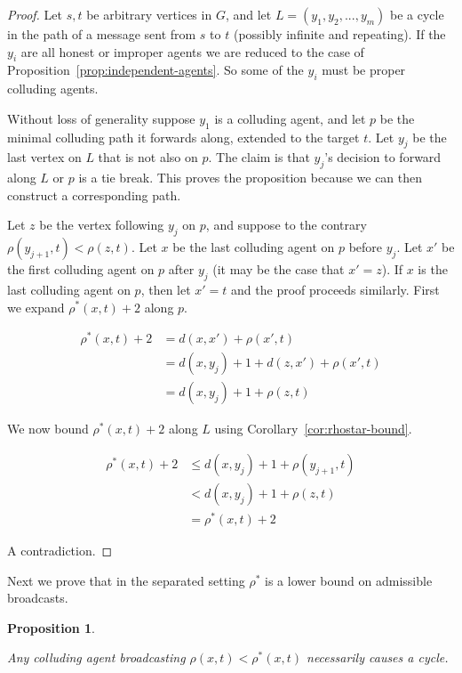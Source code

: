 \documentclass[reprint]{revtex4-1}
\newtheorem{proposition}{Proposition}[section]
\begin{document}
\begin{proof}

Let $s,t$ be arbitrary vertices in $G$, and let $L = (y_1, y_2, ..., y_m)$ be a
cycle in the path of a message sent from $s$ to $t$ (possibly infinite and
repeating). If the $y_i$ are all honest or improper agents we are reduced to
the case of Proposition~\ref{prop:independent-agents}. So some of the $y_i$
must be proper colluding agents. 

Without loss of generality suppose $y_1$ is a colluding agent, and let $p$ be
the minimal colluding path it forwards along, extended to the target $t$.  Let
$y_j$ be the last vertex on $L$ that is not also on $p$. The claim is that
$y_j$'s decision to forward along $L$ or $p$ is a tie break. This proves the
proposition because we can then construct a corresponding path. 

Let $z$ be the vertex following $y_j$ on $p$, and suppose to the contrary
$\rho(y_{j+1}, t) < \rho(z,t)$. Let $x$ be the last colluding agent on $p$
before $y_j$. Let $x'$ be the first colluding agent on $p$ after $y_j$ (it may
be the case that $x' = z$). If $x$ is the last colluding agent on $p$, then let
$x'=t$ and the proof proceeds similarly. First we expand $\rho^*(x,t) + 2$
along $p$.

\begin{align*}
   \rho^*(x,t) + 2 &= d(x,x') + \rho(x',t) \\  
                   &= d(x,y_j) + 1 + d(z,x') + \rho(x',t) \\
                   &= d(x,y_j) + 1 + \rho(z,t)
\end{align*}

We now bound $\rho^*(x,t) + 2$ along $L$ using
Corollary~\ref{cor:rhostar-bound}. 

\begin{align*}
   \rho^*(x,t) + 2 &\leq d(x, y_j) + 1 + \rho(y_{j+1}, t) \\  
                   &< d(x, y_j) + 1 + \rho(z,t) \\ 
                   &= \rho^*(x,t) + 2
\end{align*}

A contradiction.
\end{proof}

Next we prove that in the separated setting $\rho^*$ is a lower bound on
admissible broadcasts. 

\begin{proposition} \label{prop:rhostar-lower-bound}

Any colluding agent broadcasting $\rho(x,t) < \rho^*(x,t)$ necessarily causes a
cycle.

\end{proposition}
\end{document}
